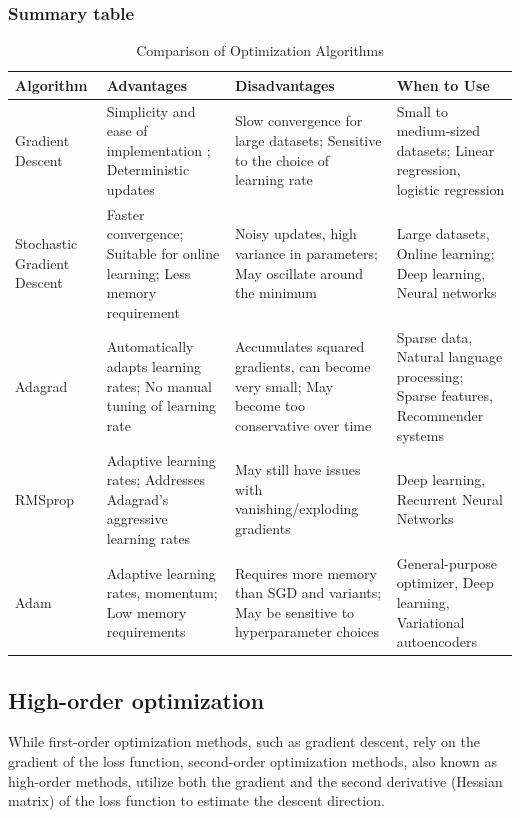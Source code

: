 \documentclass[12pt,a4paper]{article}
\begin{document}
\subsubsection{Summary table}

\begin{table}[h]
	\centering
	\caption{Comparison of Optimization Algorithms}
	\begin{tabular}{|m{}|m{}|m{}|m{}|}
		\hline
		\textbf{Algorithm} & \textbf{Advantages} & \textbf{Disadvantages} & \textbf{When to Use} \\
		\hline
		Gradient Descent &
			Simplicity and ease of implementation
			; Deterministic updates
	  & 
		Slow convergence for large datasets; Sensitive to the choice of learning rate & Small to medium-sized datasets; Linear regression, logistic regression \\
		\hline
		Stochastic Gradient Descent & Faster convergence; Suitable for online learning; Less memory requirement & Noisy updates, high variance in parameters; May oscillate around the minimum & Large datasets, Online learning; Deep learning, Neural networks \\
		\hline
		Adagrad & Automatically adapts learning rates; No manual tuning of learning rate & Accumulates squared gradients, can become very small; May become too conservative over time & Sparse data, Natural language processing; Sparse features, Recommender systems \\
		\hline
		RMSprop & Adaptive learning rates; Addresses Adagrad's aggressive learning rates & May still have issues with vanishing/exploding gradients & Deep learning, Recurrent Neural Networks \\
		\hline
		Adam & Adaptive learning rates, momentum; Low memory requirements & Requires more memory than SGD and variants; May be sensitive to hyperparameter choices & General-purpose optimizer, Deep learning, Variational autoencoders \\
		\hline
	\end{tabular}
\end{table}

\subsection{High-order optimization}
While first-order optimization methods, such as gradient descent, rely on the gradient of the loss function, second-order optimization methods, also known as high-order methods, utilize both the gradient and the second derivative (Hessian matrix) of the loss function to estimate the descent direction.
\end{document}
